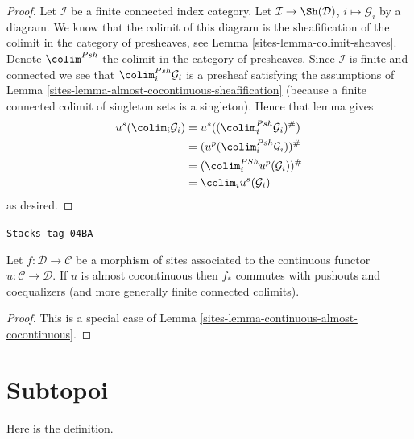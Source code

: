 \begin{proof}

Let $\mathcal{I}$ be a finite connected index category.
Let $\mathcal{I} \to \Sh(\mathcal{D})$,
$i \mapsto \mathcal{G}_i$ by a diagram. We know that the colimit of
this diagram is the sheafification of the colimit in the category of
presheaves, see
Lemma \ref{sites-lemma-colimit-sheaves}.
Denote $\colim^{Psh}$ the colimit in the category
of presheaves. Since $\mathcal{I}$ is finite and connected
we see that $\colim^{Psh}_i \mathcal{G}_i$
is a presheaf satisfying the assumptions of
Lemma \ref{sites-lemma-almost-cocontinuous-sheafification}
(because a finite connected colimit of singleton sets is a
singleton). Hence that lemma gives
\begin{align*}
u^s(\colim_i \mathcal{G}_i) & =
u^s((\colim^{Psh}_i \mathcal{G}_i)^\#) \\
& = (u^p(\colim^{Psh}_i \mathcal{G}_i))^\# \\
& = (\colim^{PSh}_i u^p(\mathcal{G}_i))^\# \\
& = \colim_i u^s(\mathcal{G}_i)
\end{align*}
as desired.
\end{proof}

\begin{lemma}
\label{sites-lemma-morphism-of-sites-almost-cocontinuous}
\href{https://stacks.math.columbia.edu/tag/04BA}{\texttt{Stacks tag 04BA}}

Let $f : \mathcal{D} \to \mathcal{C}$ be a morphism of sites
associated to the continuous functor $u : \mathcal{C} \to \mathcal{D}$.
If $u$ is almost cocontinuous then $f_*$ commutes with
pushouts and coequalizers (and more generally finite connected colimits).
\end{lemma}

\begin{proof}

This is a special case of Lemma \ref{sites-lemma-continuous-almost-cocontinuous}.
\end{proof}

\section{Subtopoi}
\label{sites-section-subtopoi}
Here is the definition.

